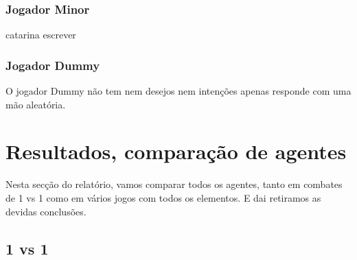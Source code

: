 \documentclass[12pt]{article}
\begin{document}
	\subsubsection*{Jogador Minor}
	catarina escrever
	
	\subsubsection*{Jogador Dummy}
	O jogador Dummy não tem nem desejos nem intenções apenas responde com uma mão aleatória.\\
	
	
	\section*{Resultados, comparação de agentes}
	
    Nesta secção do relatório, vamos comparar todos os agentes, tanto em combates de 1 vs 1 como em vários jogos com todos os elementos. E dai retiramos as devidas conclusões.\\
	
	\subsection*{1 vs 1}
	
\end{document}
